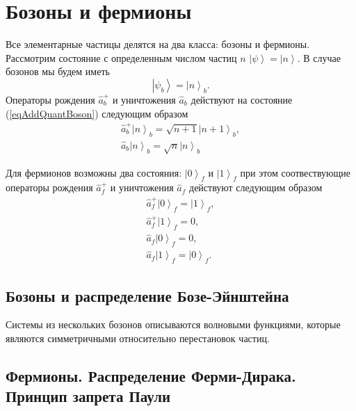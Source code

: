 \section{Бозоны и фермионы}

Все элементарные частицы делятся на два класса: бозоны и
фермионы. Рассмотрим состояние с определенным числом частиц $n$
$\left|\psi\right> = \left|n\right>$. В случае бозонов мы будем иметь 
\begin{equation}
\left|\psi_b\right> = \left|n\right>_b.
\label{eqAddQuantBoson}
\end{equation}
Операторы рождения $\hat{a}_b^{+}$ и уничтожения $\hat{a}_b$ действуют на
состояние (\ref{eqAddQuantBoson}) следующим образом
\begin{eqnarray}
\hat{a}_b^{+}\left|n\right>_b = \sqrt{n+1}\left|n+1\right>_b, 
\nonumber \\
\hat{a}_b\left|n\right>_b = \sqrt{n}\left|n\right>_b
\nonumber
\end{eqnarray}

Для фермионов возможны два состояния: $\left|0\right>_f$ и
$\left|1\right>_f$ при этом соотвествующие операторы рождения
$\hat{a}_f^{+}$ и уничтожения $\hat{a}_f$ действуют следующим образом
\begin{eqnarray}
\hat{a}_f^{+}\left|0\right>_f = \left|1\right>_f, 
\nonumber \\
\hat{a}_f^{+}\left|1\right>_f = 0, 
\nonumber \\
\hat{a}_f\left|0\right>_f = 0, 
\nonumber \\
\hat{a}_f\left|1\right>_f = \left|0\right>_f.
\nonumber
\end{eqnarray}


\subsection{Бозоны и распределение Бозе-Эйнштейна}
Системы из нескольких бозонов описываются волновыми функциями, которые
являются симметричными относительно перестановок частиц.

\subsection{Фермионы. Распределение Ферми-Дирака. Принцип запрета Паули}
